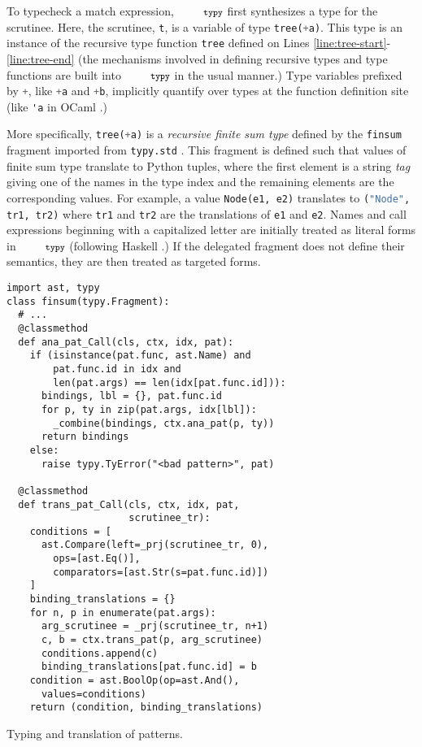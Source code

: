 \documentclass[10pt]{sigplanconf}
\newcommand{\typy}{\texttt{\footnotesize typy}}
\newcommand{\lip}[1]{\lstinline[language=Python,basicstyle=\ttfamily\footnotesize,morekeywords={with},deletendkeywords={tuple,buffer,map}]{#1}}
\newcommand{\li}[1]{\lip{#1}}
\begin{document}
To typecheck a match expression, $\typy$ first synthesizes a type for the scrutinee. Here, the scrutinee, \li{t}, is a variable of type \li{tree(+a)}. This type is an instance of the recursive type function \li{tree} defined on Lines \ref{line:tree-start}-\ref{line:tree-end} (the mechanisms involved in defining recursive types and type functions are built into $\typy$ in the usual manner.) Type variables prefixed by \li{+}, like \li{+a} and \li{+b}, implicitly quantify over types at the function definition site (like \lstinline[language=ML]{'a} in OCaml \cite{ocaml-manual}.) 

More specifically, \li{tree(+a)} is a \emph{recursive finite sum type} defined by the \li{finsum} fragment imported from \li{typy.std} \cite{pfpl}. This fragment is defined such that values of finite sum type translate to Python tuples, where the first element is a string \emph{tag} giving one of the names in the type index and the remaining elements are the corresponding values. For example, a value \li{Node(e1, e2)} translates to \li{("Node", tr1, tr2)} where \li{tr1} and \li{tr2} are the translations of \li{e1} and \li{e2}. Names and call expressions beginning with a capitalized letter are initially treated as literal forms in $\typy$ (following Haskell \cite{jones2003haskell}.) If the delegated fragment does not define their semantics, they are then treated as targeted forms.

\begin{codelisting}[t]
\vspace{-3px}
\begin{lstlisting}[deletendkeywords={slice}]
import ast, typy
class finsum(typy.Fragment):
  # ... 
  @classmethod
  def ana_pat_Call(cls, ctx, idx, pat):
    if (isinstance(pat.func, ast.Name) and 
        pat.func.id in idx and 
        len(pat.args) == len(idx[pat.func.id])):
      bindings, lbl = {}, pat.func.id
      for p, ty in zip(pat.args, idx[lbl]):
        _combine(bindings, ctx.ana_pat(p, ty))
      return bindings
    else:
      raise typy.TyError("<bad pattern>", pat)

  @classmethod
  def trans_pat_Call(cls, ctx, idx, pat, 
                     scrutinee_tr):
    conditions = [
      ast.Compare(left=_prj(scrutinee_tr, 0), 
        ops=[ast.Eq()],
        comparators=[ast.Str(s=pat.func.id)])
    ]
    binding_translations = {}
    for n, p in enumerate(pat.args):
      arg_scrutinee = _prj(scrutinee_tr, n+1)
      c, b = ctx.trans_pat(p, arg_scrutinee)
      conditions.append(c)
      binding_translations[pat.func.id] = b
    condition = ast.BoolOp(op=ast.And(), 
      values=conditions)
    return (condition, binding_translations)
\end{lstlisting}
\caption{Typing and translation of patterns.}
\label{fig:finsum}
\end{codelisting}
\end{document}
